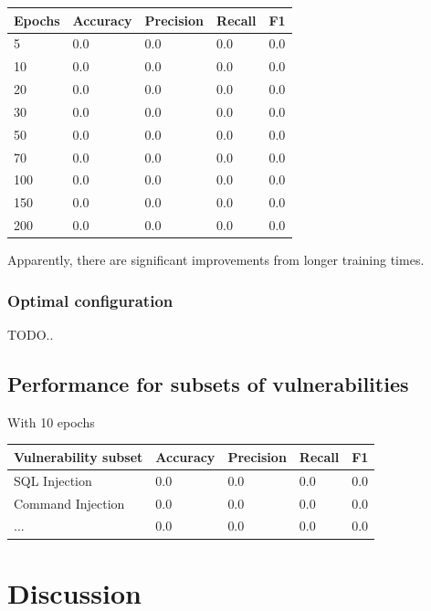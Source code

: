 \documentclass[
	a4paper,
	pagesize,
	pdftex,
	12pt,
	twoside, %
	BCOR=5mm, %
	ngerman,
	fleqn,
	final,
	]{scrartcl}
\begin{document}
\begin{tabular}{ | p{2cm} || p{2cm}|p{2cm}|p{2cm}|p{2cm}|  }
	\hline
	Epochs & Accuracy & Precision & Recall & F1 \\
	\hline
	5 & 0.0 &  0.0 &  0.0 &  0.0 \\
	10 & 0.0 &  0.0 &  0.0 &  0.0 \\
	20 & 0.0 &  0.0 &  0.0 &  0.0 \\
	30 & 0.0 &  0.0 &  0.0 &  0.0 \\
	50 & 0.0 &  0.0 &  0.0 &  0.0 \\
	70 & 0.0 &  0.0 &  0.0 &  0.0 \\
	100 & 0.0 &  0.0 &  0.0 &  0.0 \\
	150 & 0.0 &  0.0 &  0.0 &  0.0 \\
	200 & 0.0 &  0.0 &  0.0 &  0.0 \\
	\hline
	\hline
\end{tabular}

Apparently, there are significant improvements from longer training times. 

\subsubsection{Optimal configuration}


TODO..






\subsection{Performance for subsets of vulnerabilities}


With 10 epochs

\begin{tabular}{ | p{5cm} || p{2cm}|p{2cm}|p{2cm}|p{2cm}|  }
	\hline
	\textbf{Vulnerability subset} & \textbf{Accuracy} & \textbf{Precision} & \textbf{Recall} & \textbf{F1} \\
	\hline
	SQL Injection & 0.0 &  0.0 &  0.0 &  0.0 \\
	Command Injection & 0.0 &  0.0 &  0.0 &  0.0 \\
	... & 0.0 &  0.0 &  0.0 &  0.0 \\
	\hline
	\hline
\end{tabular}



\newpage
\section{Discussion}
\end{document}
